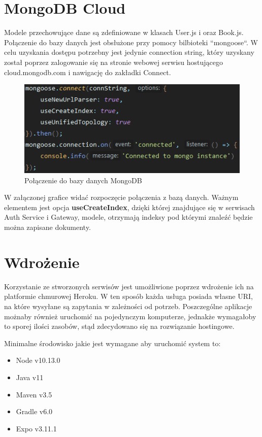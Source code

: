 
\section{MongoDB Cloud}
 
Modele przechowujące dane są zdefiniowane w klasach User.js i
oraz Book.js. Połączenie do bazy danych jest obsłużone przy pomocy bilbioteki ``mongoose``. W celu uzyskania dostępu potrzebny jest jedynie connection string, który uzyskany został poprzez zalogowanie się na stronie webowej serwisu hostującego cloud.mongodb.com i nawigację do zakładki Connect.
\begin{figure}[H]
	\centering
	\includegraphics[width=\linewidth]{mongo.png}
	\caption{Połączenie do bazy danych MongoDB}
\end{figure}
W załączonej grafice widać rozpoczęcie połączenia z bazą danych. Ważnym elementem jest opcja \textbf{useCreateIndex}, dzięki której znajdujące się w serwisach Auth Service i Gateway, modele, otrzymają indeksy pod którymi znaleźć będzie można zapisane dokumenty. 


\section{Wdrożenie}

Korzystanie ze stworzonych serwisów jest umożliwione poprzez wdrożenie ich na platformie chmurowej Heroku.
W ten sposób każda usługa posiada własne URI, na które wysyłane są zapytania w zależności od potrzeb.
Poszczególne aplikacje możnaby również uruchomić na pojedynczym komputerze, jednakże wymagałoby to sporej ilości zasobów, stąd zdecydowano się na rozwiązanie hostingowe.

Minimalne środowisko jakie jest wymagane aby uruchomić system to:
\begin{itemize}
	\item Node v10.13.0
	\item Java v11
	\item Maven v3.5
	\item Gradle v6.0
	\item Expo v3.11.1
\end{itemize}

